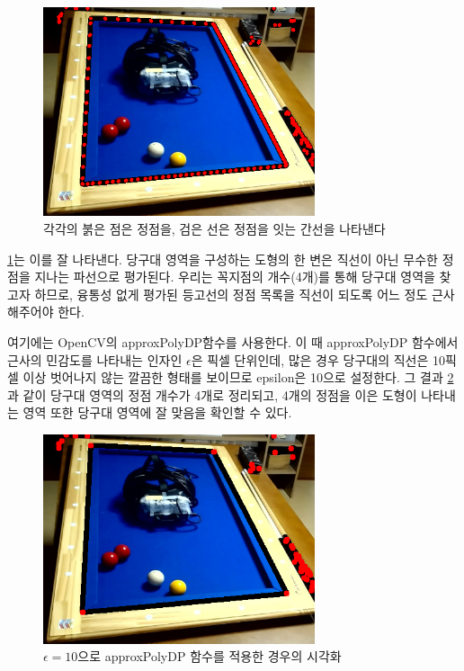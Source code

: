 \documentclass[10pt]{oblivoir}
\begin{document}
\begin{figure}[ht]
    \centering
    \includegraphics[width=8cm]{img/billiards-table-contours-dot-view.png}
    \caption{각각의 붉은 점은 정점을, 검은 선은 정점을 잇는 간선을 나타낸다}
    \label{fig;table-contour-dot-view}
\end{figure}

\cref{fig;table-contour-dot-view}는 이를 잘 나타낸다. 당구대 영역을 구성하는 도형의 한 변은 직선이 아닌 무수한 정점을 지나는 파선으로 평가된다. 우리는 꼭지점의 개수(4개)를 통해 당구대 영역을 찾고자 하므로, 융통성 없게 평가된 등고선의 정점 목록을 직선이 되도록 어느 정도 근사해주어야 한다.

여기에는 OpenCV의 approxPolyDP\footnotemark 함수를 사용한다. 이 때 approxPolyDP 함수에서 근사의 민감도를 나타내는 인자인 $\epsilon$은 픽셀 단위인데, 많은 경우 당구대의 직선은 10픽셀 이상 벗어나지 않는 깔끔한 형태를 보이므로 epsilon은 10으로 설정한다. 그 결과 \cref{fig;table-contour-dot-view-approx}과 같이 당구대 영역의 정점 개수가 4개로 정리되고, 4개의 정점을 이은 도형이 나타내는 영역 또한 당구대 영역에 잘 맞음을 확인할 수 있다.

\begin{figure}[ht]
    \centering
    \includegraphics[width=8cm]{img/billiards-table-contours-dot-view-approx.png}
    \caption{$\epsilon=10$으로 approxPolyDP 함수를 적용한 경우의 시각화}
    \label{fig;table-contour-dot-view-approx}
\end{figure}
\end{document}
